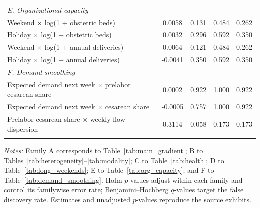 \begin{table}[H]
{\begin{tabular}{lcccc}
      \emph{E. Organizational capacity} & & & & \\
      \quad Weekend $\times$ log(1 + obstetric beds) & 0.0058 & 0.131 & 0.484 & 0.262 \\
      \quad Holiday $\times$ log(1 + obstetric beds) & 0.0032 & 0.296 & 0.592 & 0.350 \\
      \quad Weekend $\times$ log(1 + annual deliveries) & 0.0064 & 0.121 & 0.484 & 0.262 \\
      \quad Holiday $\times$ log(1 + annual deliveries) & -0.0041 & 0.350 & 0.592 & 0.350 \\
      \addlinespace[3pt]
      \emph{F. Demand smoothing} & & & & \\
      \quad Expected demand next week $\times$ prelabor cesarean share & 0.0002 & 0.922 & 1.000 & 0.922 \\
      \quad Expected demand next week $\times$ cesarean share & -0.0005 & 0.757 & 1.000 & 0.922 \\
      \quad Prelabor cesarean share $\times$ weekly flow dispersion & 0.3114 & 0.058 & 0.173 & 0.173 \\
      \addlinespace[3pt]
\bottomrule
   \end{tabular}
}
\begin{minipage}{\linewidth}\footnotesize
\textit{Notes:} Family A corresponds to Table~\ref{tab:main_gradient}; B to Tables~\ref{tab:heterogeneity}--\ref{tab:modality}; C to Table~\ref{tab:health}; D to Table~\ref{tab:long_weekends}; E to Table~\ref{tab:org_capacity}; and F to Table~\ref{tab:demand_smoothing}. Holm $p$-values \citep{holm1979} adjust within each family and control its familywise error rate; Benjamini--Hochberg $q$-values \citep{benjamini1995} target the false discovery rate. Estimates and unadjusted $p$-values reproduce the source exhibits.
\end{minipage}
\end{table}

